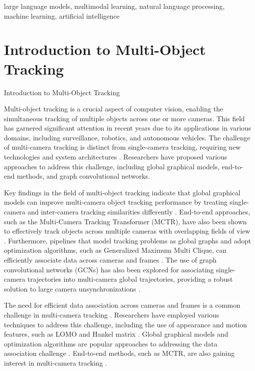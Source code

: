 \documentclass[conference]{IEEEtran}
\begin{document}
\begin{IEEEkeywords}
large language models, multimodal learning, natural language processing, machine learning, artificial intelligence
\end{IEEEkeywords}


\section{Introduction to Multi-Object Tracking}
Introduction to Multi-Object Tracking

Multi-object tracking is a crucial aspect of computer vision, enabling the simultaneous tracking of multiple objects across one or more cameras. This field has garnered significant attention in recent years due to its applications in various domains, including surveillance, robotics, and autonomous vehicles. The challenge of multi-camera tracking is distinct from single-camera tracking, requiring new technologies and system architectures \cite{Challenge of Multi-Camera Tracking}. Researchers have proposed various approaches to address this challenge, including global graphical models, end-to-end methods, and graph convolutional networks.

Key findings in the field of multi-object tracking indicate that global graphical models can improve multi-camera object tracking performance by treating single-camera and inter-camera tracking similarities differently \cite{An equalised global graphical model-based approach for multi-camera object tracking}. End-to-end approaches, such as the Multi-Camera Tracking Transformer (MCTR), have also been shown to effectively track objects across multiple cameras with overlapping fields of view \cite{MCTR: Multi Camera Tracking Transformer}. Furthermore, pipelines that model tracking problems as global graphs and adopt optimization algorithms, such as Generalized Maximum Multi Clique, can efficiently associate data across cameras and frames \cite{Multi-camera Multi-Object Tracking}. The use of graph convolutional networks (GCNs) has also been explored for associating single-camera trajectories into multi-camera global trajectories, providing a robust solution to large camera unsynchronizations \cite{Graph Convolutional Network for Multi-Target Multi-Camera Vehicle Tracking}.

The need for efficient data association across cameras and frames is a common challenge in multi-camera tracking \cite{Challenge of Multi-Camera Tracking, Multi-camera Multi-Object Tracking}. Researchers have employed various techniques to address this challenge, including the use of appearance and motion features, such as LOMO and Hankel matrix \cite{Multi-camera Multi-Object Tracking}. Global graphical models and optimization algorithms are popular approaches to addressing the data association challenge \cite{An equalised global graphical model-based approach for multi-camera object tracking, Multi-camera Multi-Object Tracking}. End-to-end methods, such as MCTR, are also gaining interest in multi-camera tracking \cite{MCTR: Multi Camera Tracking Transformer}.
\end{document}
